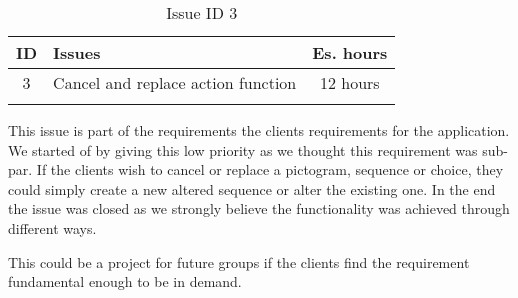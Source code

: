 \begin{longtable} { | c | p{12cm} | c | } 
\hline
	ID 	&	Issues	&		 Es. hours \\\hline
	3 	&	Cancel and replace action function	&	12 hours \\\hline
\caption{Issue ID 3}
\label{tab:spr3_cancelreplaceaction}
\end{longtable}

This issue is part of the requirements the clients requirements for the application. We started of by giving this low priority as we thought this requirement was sub-par. If the clients wish to cancel or replace a pictogram, sequence or choice, they could simply create a new altered sequence or alter the existing one. In the end the issue was closed as we strongly believe the functionality was achieved through different ways.

This could be a project for future groups if the clients find the requirement fundamental enough to be in demand.